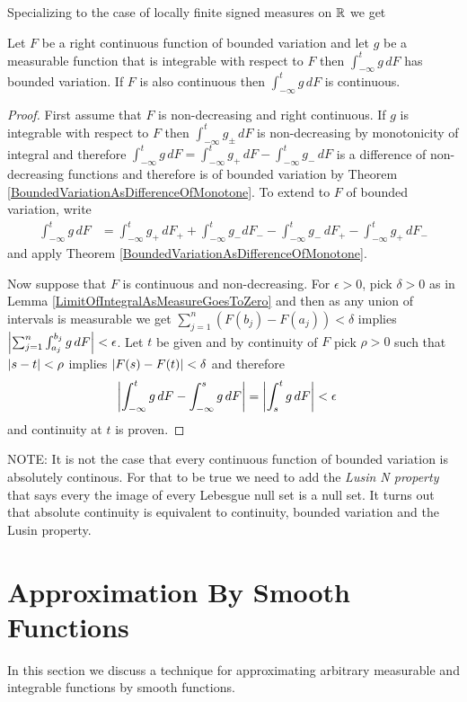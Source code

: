 Specializing to the case of locally finite signed measures on $\mathbb{R}$ we get
\begin{cor}\label{StieltjesIntegralBoundedVariationAndContinuous}Let $F$ be a right continuous function of bounded variation and let $g$ be a
  measurable function that is integrable with respect to $F$ then
  $\int_{-\infty}^t g \, dF$ has bounded variation.  If $F$ is also
  continuous then $\int_{-\infty}^t g \, dF$ is continuous.
\end{cor}
\begin{proof}
First assume that $F$ is
non-decreasing and right continuous.  If $g$ is integrable with respect to $F$ then
$\int_{-\infty}^t g_\pm \, dF$ is non-decreasing by monotonicity of integral and therefore
$\int_{-\infty}^t g \, dF = \int_{-\infty}^t g_+ \, dF -
\int_{-\infty}^t g_- \, dF$ is a difference of non-decreasing
functions and therefore is of bounded variation by Theorem \ref{BoundedVariationAsDifferenceOfMonotone}.  To extend to $F$ of
bounded variation, write 
\begin{align*}
\int_{-\infty}^t g \, dF &= \int_{-\infty}^t g_+ \, dF_+ +
\int_{-\infty}^t g_- dF_- -
\int_{-\infty}^t g_- \, dF_+ - \int_{-\infty}^t g_+ \, dF_-
\end{align*}
and apply Theorem  \ref{BoundedVariationAsDifferenceOfMonotone}.

Now suppose that $F$ is continuous and non-decreasing.  For $\epsilon > 0$, pick $\delta>0$ as in Lemma
\ref{LimitOfIntegralAsMeasureGoesToZero} and then as any union of
intervals is measurable we get $\sum_{j=1}^n (F(b_j)-F(a_j)) < \delta$
implies $\left \vert \sum_{j=1}^n \int_{a_j}^{b_j} g \, dF \right \vert < \epsilon$.
Let $t$ be given and by continuity of $F$ pick $\rho > 0$ such that
$\left \vert s - t \right \vert < \rho$ implies $\left \vert F(s) - F(t) \right \vert < \delta$ and
therefore 
\begin{align*}
\left \vert \int_{-\infty}^t g \, dF - \int_{-\infty}^s g \, dF \right \vert &=
\left \vert \int_s^t g \, dF \right \vert < \epsilon
\end{align*}
and continuity at $t$ is proven.
\end{proof}

NOTE:  It is not the case that every continuous function of bounded
variation is absolutely continous.  For that to be true we need to add
the \emph{Lusin N property} that says every the image of every Lebesgue
null set is a null set.  It turns out that absolute continuity is
equivalent to continuity, bounded variation and the Lusin property.

\section{Approximation By Smooth Functions}
In this section we discuss a technique for approximating arbitrary
measurable and integrable functions by smooth functions.  

